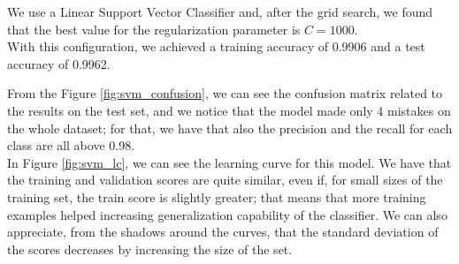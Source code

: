 We use a Linear Support Vector Classifier and, after the grid search, we found that the best value for the regularization parameter is $C=1000$.\\
With this configuration, we achieved a training accuracy of 0.9906 and a test accuracy of 0.9962.

From the Figure \ref{fig:svm_confusion}, we can see the confusion matrix related to the results on the test set, and we notice that the model made only 4 mistakes on the whole dataset; for that, we have that also the precision and the recall for each class are all above 0.98.\\
In Figure \ref{fig:svm_lc}, we can see the learning curve for this model. We have that the training and validation scores are quite similar, even if, for small sizes of the training set, the train score is slightly greater; that means that more training examples helped increasing generalization capability of the classifier.   
We can also appreciate, from the shadows around the curves, that the standard deviation of the scores decreases by increasing the size of the set.

\pagebreak


